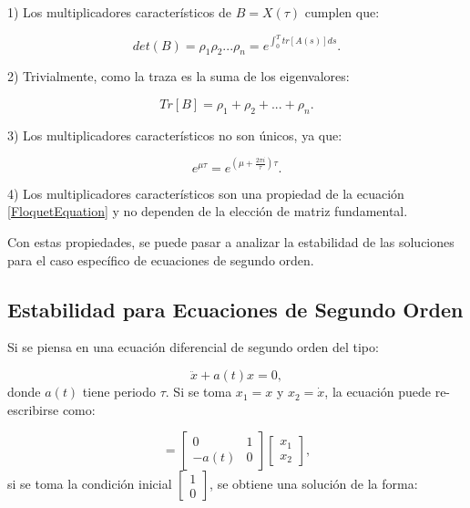 \documentclass[a4paper,10pt]{report}
\begin{document}
1) Los multiplicadores característicos de $B=X(\tau)$ cumplen que:

\begin{equation}
det(B) = \rho_1 \rho_2 ... \rho_n = e^{\int_0^T tr[A(s)]ds}.
\end{equation}

2) Trivialmente, como la traza es la suma de los eigenvalores:

\begin{equation}
Tr[B] = \rho_1 + \rho_2 + ... + \rho_n.
\end{equation}

3) Los multiplicadores característicos no son únicos, ya que:

\begin{equation}
e^{\mu \tau} = e^{(\mu  +\frac{2\pi i}{\tau} )\tau}.
\end{equation}

4) Los multiplicadores característicos son una propiedad de la ecuación \ref{FloquetEquation} y no dependen de la elección de matriz fundamental.

Con estas propiedades, se puede pasar a analizar la estabilidad de las soluciones para el caso específico de ecuaciones de segundo orden.

\subsection{Estabilidad para Ecuaciones de Segundo Orden}

Si se piensa en una ecuación diferencial de segundo orden del tipo:

\begin{equation}
\ddot{x} + a(t)x= 0,
\end{equation} donde $a(t)$ tiene periodo $\tau$. Si se toma $x_1 = x$ y $x_2 = \dot{x}$, la ecuación puede re-escribirse como:

\begin{equation}
[\begin{array}{c}
\dot{x_1} \\
\dot{x_2}
\end{array}] = [\begin{array}{cc}
0 & 1 \\
-a(t) & 0
\end{array}][\begin{array}{c} 
x_1 \\ 
x_2

\end{array}],
\end{equation} si se toma la condición inicial $[\begin{array}{c} 1 \\ 0 \end{array}]$, se obtiene una solución de la forma:
\end{document}
